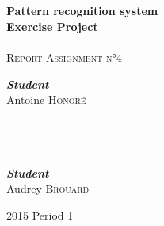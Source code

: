 \begin{titlepage}
  \begin{sffamily}
    \begin{center}

      \textsc{ }\\[1.5cm]

      \HRule \\[0.4cm]
      { \Huge \bfseries Pattern recognition system\\Exercise Project\\[0.4cm] }
      \HRule \\[2.5cm]
      \textsc{\LARGE Report Assignment n°4}~\\[2.5cm]
      \begin{minipage}{0.4\textwidth}
        \begin{flushleft} \large
          \emph{\textbf{Student}}\\
          Antoine \textsc{Honoré}\\
          ~\\~\\~\\
        \end{flushleft}
      \end{minipage}
      \hfill
      \begin{minipage}{0.4\textwidth}
        \begin{flushright} \large
          \emph{\textbf{Student}}\\
          Audrey \textsc{Brouard}\\
        \end{flushright}
      \end{minipage}

     

      \vfill

      {\large 2015 Period 1}

    \end{center}
  \end{sffamily}

\end{titlepage}


